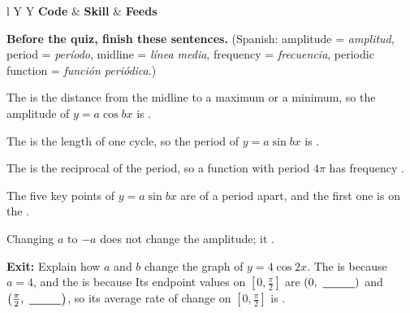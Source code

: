 \vspace{2pt}
\begin{tabularx}{\textwidth}{l Y Y}
\toprule
\textbf{Code} & \textbf{Skill} & \textbf{Feeds} \\
\midrule
{}
\bottomrule
\end{tabularx}

\vspace{8pt}
\textbf{Before the quiz, finish these sentences.} {\small (Spanish: amplitude = \emph{amplitud}, period = \emph{período}, midline = \emph{línea media}, frequency = \emph{frecuencia}, periodic function = \emph{función periódica}.)}

The \blank[2.5cm] is the distance from the midline to a maximum or a minimum, so the amplitude of $y=a\cos bx$ is \blank[2cm].

The \blank[2.5cm] is the length of one cycle, so the period of $y=a\sin bx$ is \blank[2cm].

The \blank[2.2cm] is the reciprocal of the period, so a function with period $4\pi$ has frequency \blank[1.8cm].

The five key points of $y=a\sin bx$ are \blank[2.2cm] of a period apart, and the first one is on the \blank[2.2cm].

Changing $a$ to $-a$ does not change the amplitude; it \blank[6cm].

\vspace{6pt}
\textbf{Exit:} Explain how $a$ and $b$ change the graph of $y=4\cos 2x$. The \blank[2.2cm] is \blank[1.4cm] because $a=4$, and the \blank[2.2cm] is \blank[1.4cm] because \lines[2]
Its endpoint values on $\left[0,\frac{\pi}{2}\right]$ are $(0,\ \blank[1cm])$ and $\left(\frac{\pi}{2},\ \blank[1cm]\right)$, so its average rate of change on $\left[0,\frac{\pi}{2}\right]$ is \blank[2cm].


